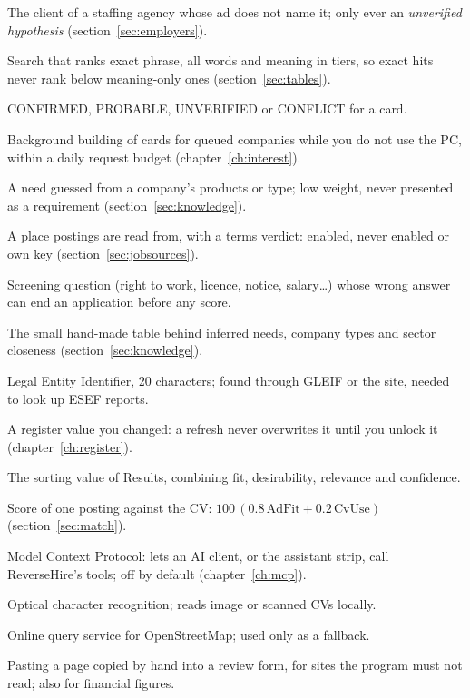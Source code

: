 \begin{description}[style=unboxed, leftmargin=1.2em, itemsep=2pt, font=\normalfont\bfseries\color{othDark}]
\item[Hidden employer] The client of a staffing agency whose ad does not name it; only ever an \emph{unverified hypothesis} (section~\ref{sec:employers}).
\item[Hybrid ranking] Search that ranks exact phrase, all words and meaning in tiers, so exact hits never rank below meaning-only ones (section~\ref{sec:tables}).
\item[Identity status] CONFIRMED, PROBABLE, UNVERIFIED or CONFLICT for a card.
\item[Idle analysis] Background building of cards for queued companies while you do not use the PC, within a daily request budget (chapter~\ref{ch:interest}).
\item[Inferred need] A need guessed from a company's products or type; low weight, never presented as a requirement (section~\ref{sec:knowledge}).
\item[Job source] A place postings are read from, with a terms verdict: enabled, never enabled or own key (section~\ref{sec:jobsources}).
\item[Knock-out question] Screening question (right to work, licence, notice, salary\ldots) whose wrong answer can end an application before any score.
\item[Knowledge table] The small hand-made table behind inferred needs, company types and sector closeness (section~\ref{sec:knowledge}).
\item[LEI] Legal Entity Identifier, 20 characters; found through GLEIF or the site, needed to look up ESEF reports.
\item[Lock] A register value you changed: a refresh never overwrites it until you unlock it (chapter~\ref{ch:register}).
\item[Match] The sorting value of Results, combining fit, desirability, relevance and confidence.
\item[Match with my CV] Score of one posting against the CV: $100\,(0.8\,\mathrm{AdFit}+0.2\,\mathrm{CvUse})$ (section~\ref{sec:match}).
\item[MCP] Model Context Protocol: lets an AI client, or the assistant strip, call ReverseHire's tools; off by default (chapter~\ref{ch:mcp}).
\item[OCR] Optical character recognition; reads image or scanned CVs locally.
\item[Overpass] Online query service for OpenStreetMap; used only as a fallback.
\item[Paste and review] Pasting a page copied by hand into a review form, for sites the program must not read; also for financial figures.

\end{description}
